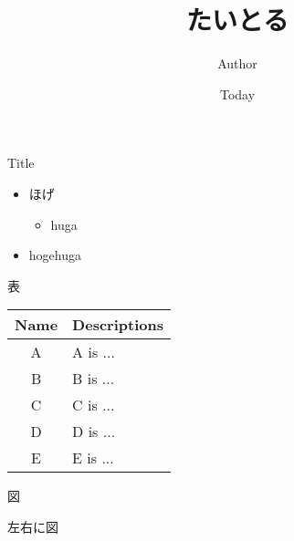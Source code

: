 \documentclass[14pt,dvipdfmx]{beamer} %
\title{たいとる}
\author{Author}
\date{Today}
\begin{document}
\begin{frame}
\titlepage
\end{frame}

\begin{frame}
\begin{block}{Title}
\begin{itemize}
 \item ほげ
  \begin{itemize}
  \item huga
  \end{itemize}
 \item hogehuga
\end{itemize}
\end{block}
\end{frame}


\begin{frame}{表}
 \centering
 \begin{tabular}{c|l}
   Name & Descriptions \\ \hline
   A & A is ... \\ [2mm]
   B & B is ... \\ [2mm]
   C & C is ... \\ [2mm]
   D & D is ... \\ [2mm]
   E & E is ...
 \end{tabular}
\end{frame}


\begin{frame}{図}
  \centering
\end{frame}


\begin{frame}{左右に図}
 \begin{columns}[t]
 \end{columns}
\end{frame}
\end{document}
